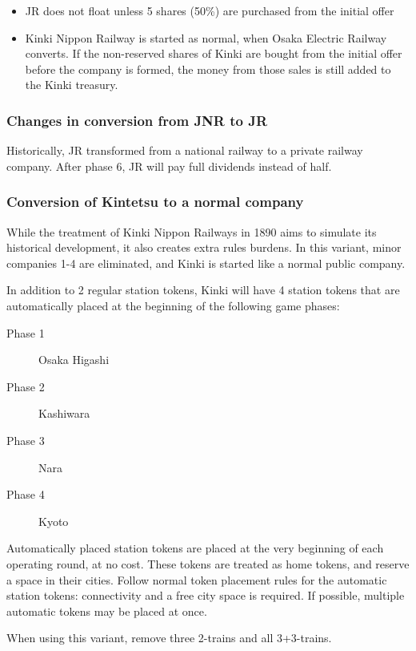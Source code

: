 \documentclass{article}
\begin{document}
\begin{CJK}{UTF8}{min}
\begin{multicols}{2}
\begin{itemize}
\item JR does not float unless 5 shares (50\%) are purchased
  from the initial offer

\item Kinki Nippon Railway is started as normal, when Osaka Electric
  Railway converts. If the non-reserved shares of Kinki are bought
  from the initial offer before the company is formed, the money from
  those sales is still added to the Kinki treasury.

\end{itemize}

\subsubsection{Changes in conversion from JNR to JR}
Historically, JR transformed from a national railway to a private
railway company. After phase 6, JR will pay full dividends instead of
half.

\subsubsection{Conversion of Kintetsu to a normal company}
While the treatment of Kinki Nippon Railways in 1890 aims to simulate
its historical development, it also creates extra rules burdens. In
this variant, minor companies 1-4 are eliminated, and Kinki is started
like a normal public company.

In addition to 2 regular station tokens, Kinki will have 4 station
tokens that are automatically placed at the beginning of the following
game phases:

\begin{description}
\item[Phase 1] Osaka Higashi
\item[Phase 2] Kashiwara
\item[Phase 3] Nara
\item[Phase 4] Kyoto
\end{description}

Automatically placed station tokens are placed at the very beginning
of each operating round, at no cost. These tokens are treated as home
tokens, and reserve a space in their cities.  Follow normal token
placement rules for the automatic station tokens: connectivity and a
free city space is required. If possible, multiple automatic tokens
may be placed at once.

When using this variant, remove three 2-trains and all 3+3-trains.


\end{multicols}
\end{CJK}
\end{document}
